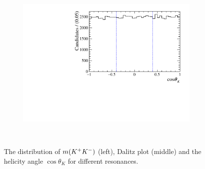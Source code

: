 \begin{figure}[!ht]
\begin{subfigure}[t]{0.32\textwidth}
        \includegraphics[width=1.0\textwidth]{figs/B2DsPhi/a0_Helicity.pdf}
    \end{subfigure}\\ 

    \caption{The distribution of $m({{K}^+}{{K}^-})$ (left), Dalitz plot (middle) and the helicity angle $\cos\theta_{K}$ for different resonances.} 
    \label{fig:models_one}   
\end{figure}


